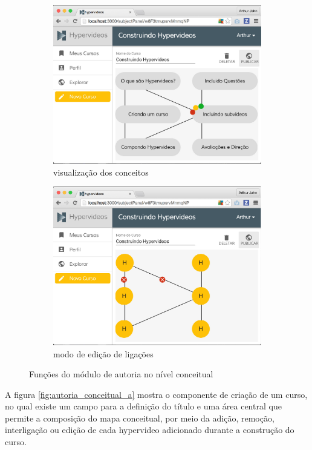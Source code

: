 \begin{figure}[h!]
	\begin{subfigure}{.5\textwidth}
  		\centering
  		\includegraphics[width=.9\linewidth]{figuras/autoria_conceitual_c.eps}
  		\caption{visualização dos conceitos}
  		\label{fig:autoria_conceitual_c}
	\end{subfigure}%
	\begin{subfigure}{.5\textwidth}
  		\centering
  		\includegraphics[width=.9\linewidth]{figuras/autoria_conceitual_d.eps}
  		\caption{modo de edição de ligações}
  		\label{fig:autoria_conceitual_d}
	\end{subfigure}%
  	\caption{Funções do módulo de autoria no nível conceitual}
  	\label{fig:autoria_conceitual}
\end{figure}

A figura \ref{fig:autoria_conceitual_a} mostra o componente de criação de um curso, no qual existe um campo para a definição do título e uma área central que permite a composição do mapa conceitual, por meio da adição, remoção, interligação ou edição de cada hypervideo adicionado durante a construção do curso.

